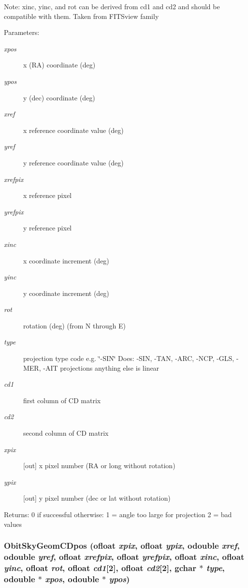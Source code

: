 Note: xinc, yinc, and rot can be derived from cd1 and cd2 and should be compatible with them. Taken from FITSview family \begin{Desc}
\item[Parameters:]
\begin{description}
\item[{\em xpos}]x (RA) coordinate (deg) \item[{\em ypos}]y (dec) coordinate (deg) \item[{\em xref}]x reference coordinate value (deg) \item[{\em yref}]y reference coordinate value (deg) \item[{\em xrefpix}]x reference pixel \item[{\em yrefpix}]y reference pixel \item[{\em xinc}]x coordinate increment (deg) \item[{\em yinc}]y coordinate increment (deg) \item[{\em rot}]rotation (deg) (from N through E) \item[{\em type}]projection type code e.g. \char`\"{}-SIN\char`\"{} Does: -SIN, -TAN, -ARC, -NCP, -GLS, -MER, -AIT projections anything else is linear \item[{\em cd1}]first column of CD matrix \item[{\em cd2}]second column of CD matrix \item[{\em xpix}][out] x pixel number (RA or long without rotation) \item[{\em ypix}][out] y pixel number (dec or lat without rotation) \end{description}
\end{Desc}
\begin{Desc}
\item[Returns:]0 if successful otherwise: 1 = angle too large for projection 2 = bad values \end{Desc}
\subsubsection{ Obit\-Sky\-Geom\-CDpos ({\bf ofloat} {\em xpix}, {\bf ofloat} {\em ypix}, {\bf odouble} {\em xref}, {\bf odouble} {\em yref}, {\bf ofloat} {\em xrefpix}, {\bf ofloat} {\em yrefpix}, {\bf ofloat} {\em xinc}, {\bf ofloat} {\em yinc}, {\bf ofloat} {\em rot}, {\bf ofloat} {\em cd1}[2], {\bf ofloat} {\em cd2}[2], gchar $\ast$ {\em type}, {\bf odouble} $\ast$ {\em xpos}, {\bf odouble} $\ast$ {\em ypos})}\label{ObitSkyGeom_8h_a14}


